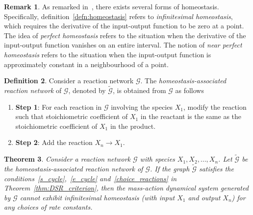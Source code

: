 \documentclass[11pt]{article}
\theoremstyle{plain}
\newtheorem{theorem}{Theorem}[section]
\theoremstyle{definition}
\newtheorem{definition}[theorem]{Definition}
\newtheorem{remark}[theorem]{Remark}
\theoremstyle{remark}
\newcommand\GG{\mathcal{G}}
\begin{document}
\bigskip


\begin{remark}
As remarked in~\cite{wang2020structure}, there exists several forms of homeostasis. Specifically, definition~\ref{defn:homeostasis} refers to \emph{infinitesimal homeostasis}, which requires the derivative of the input-output function to be zero at a point. The idea of \emph{perfect homeostasis} refers to the situation when the derivative of the input-output function vanishes on an entire interval. The notion of \emph{near perfect homeostasis} refers to the situation when the input-output function is approximately constant in a neighbourhood of a point. 
\end{remark}



\begin{definition}\label{homeostasis_association}
Consider a reaction network $\GG$. The \emph{homeostasis-associated reaction network} of $\GG$, denoted by $\tilde{\GG}$, is obtained from $\GG$ as follows
\begin{enumerate}
\item[] \textbf{Step 1}: For each reaction in $\GG$ involving the species $X_1$, modify the reaction such that stoichiometric coefficient of $X_1$ in the reactant is the same as the stoichiometric coefficient of $X_1$ in the product.

\item[] \textbf{Step 2}: Add the reaction $X_n\rightarrow X_1$. 
\end{enumerate} 
\end{definition}




\begin{theorem}\label{thm:reaction_network_homeostasis}
Consider a reaction network $\GG$ with species $X_1,X_2,...,X_n$. Let $\tilde{\GG}$ be the homeostasis-associated reaction network of $\GG$. If the  graph  $\tilde{\GG}$ satisfies the conditions~\ref{s_cycle},~\ref{e_cycle} and~\ref{choice_reactions} in Theorem~\ref{thm:DSR_criterion}, then the mass-action dynamical system generated by $\GG$ cannot exhibit infinitesimal homeostasis (with input $X_1$ and output $X_n$) for any choices of rate constants.
\end{theorem}

 
\end{document}
